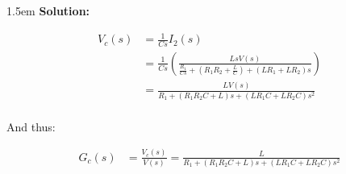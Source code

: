 \documentclass{article}
\newenvironment{solution}{
	\vspace{.5em}
	\par
	\begin{adjustwidth}{1.5em}{}
	\textbf{{Solution:}}
	\par
	\vspace{.5em}
}{
	\vspace{1em}
	\end{adjustwidth}
}
\begin{document}
\begin{solution}
	\begin{align*}
		V_c(s) &= \tfrac{1}{Cs} I_2(s) \\
			&= \tfrac{1}{Cs} \left( \frac{Ls V(s)}{\frac{R_1}{Cs} + \left( R_1 R_2 + \frac{L}{C} \right) + (LR_1 + LR_2) s} \right) \\
			&= \frac{L V(s)}{R_1 + (R_1 R_2 C + L) s + (LR_1 C + LR_2 C) s^2} \\
	\end{align*}

	And thus:

	\begin{align*}
		G_c(s) &= \frac{V_c(s)}{V(s)} = \frac{L}{R_1 + (R_1 R_2 C + L) s + (LR_1 C + LR_2 C) s^2} \\
	\end{align*}
\end{solution}

\ifdefined\iscombined
	\newpage
\else
	
\end{document}
